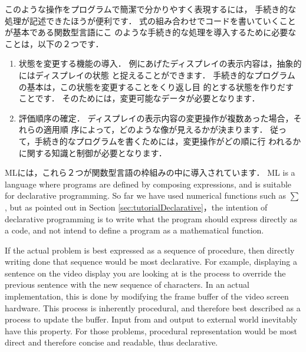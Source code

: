 \documentclass{jbook}
\begin{document}
	このような操作をプログラムで簡潔で分かりやすく表現するには，
手続き的な処理が記述できたほうが便利です．
	式の組み合わせでコードを書いていくことが基本である関数型言語にこ
のような手続き的な処理を導入するために必要なことは，以下の２つです．
\begin{enumerate}
\item 状態を変更する機能の導入．
	例にあげたディスプレイの表示内容は，抽象的にはディスプレイの状態
と捉えることができます．
	手続き的なプログラムの基本は，この状態を変更することをくり返し目
的とする状態を作りだすことです．
	そのためには，変更可能なデータが必要となります．
\item 評価順序の確定．
	ディスプレイの表示内容の変更操作が複数あった場合，それらの適用順
序によって，どのような像が見えるかが決まります．
	従って，手続き的なプログラムを書くためには，変更操作がどの順に行
われるかに関する知識と制御が必要となります．
\end{enumerate}
	MLには，これら２つが関数型言語の枠組みの中に導入されています．
\else%
	ML is a language where programs are defined by composing
expressions, and is suitable for declarative programming.
	So far we have used numerical functions such as $\sum$, but as
pointed out in Section \ref{sec:tutorialDeclarative}，the intention of
declarative programming is to write what the program should express
directly as a code, and not intend to define a program as a mathematical
function.

	If the actual problem is best expressed as a sequence of
procedure, then directly writing done that sequence would be most
declarative.
	For example, displaying a sentence on the video display you are
looking at is the process to override the previous sentence with the new
sequence of characters.
	In an actual implementation, this is done by modifying the frame
buffer of the video screen hardware.
	This process is inherently procedural, and therefore best
described as a process to update the buffer.
	Input from and output to external world inevitably have this
property.
	For those problems, procedural representation would be most
direct and therefore concise and readable, thus declarative.
	
\end{document}
